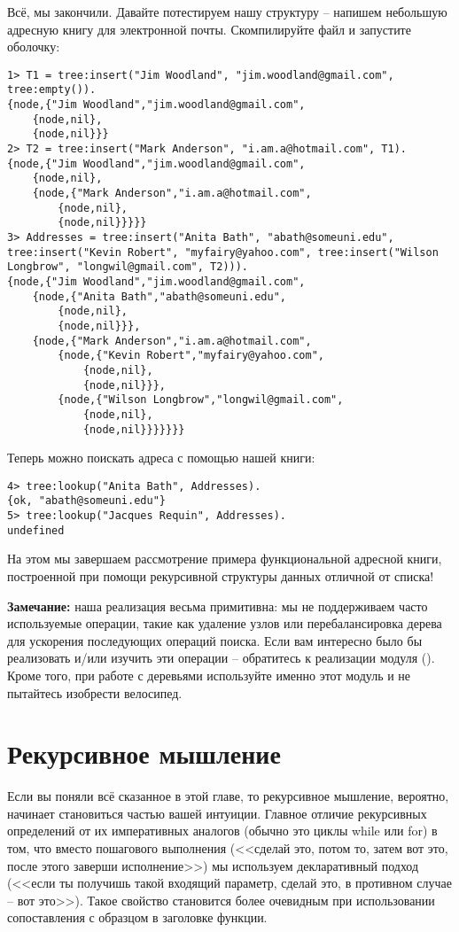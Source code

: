Всё, мы закончили.
Давайте потестируем нашу структуру \--- напишем небольшую адресную книгу для электронной почты.
Скомпилируйте файл и запустите оболочку:
\begin{lstlisting}[style=erlang]
1> T1 = tree:insert("Jim Woodland", "jim.woodland@gmail.com", tree:empty()).
{node,{"Jim Woodland","jim.woodland@gmail.com",
    {node,nil},
    {node,nil}}}
2> T2 = tree:insert("Mark Anderson", "i.am.a@hotmail.com", T1).
{node,{"Jim Woodland","jim.woodland@gmail.com",
    {node,nil},
    {node,{"Mark Anderson","i.am.a@hotmail.com",
        {node,nil},
        {node,nil}}}}}
3> Addresses = tree:insert("Anita Bath", "abath@someuni.edu", tree:insert("Kevin Robert", "myfairy@yahoo.com", tree:insert("Wilson Longbrow", "longwil@gmail.com", T2))).
{node,{"Jim Woodland","jim.woodland@gmail.com",
    {node,{"Anita Bath","abath@someuni.edu",
        {node,nil},
        {node,nil}}},
    {node,{"Mark Anderson","i.am.a@hotmail.com",
        {node,{"Kevin Robert","myfairy@yahoo.com",
            {node,nil},
            {node,nil}}},
        {node,{"Wilson Longbrow","longwil@gmail.com",
            {node,nil},
            {node,nil}}}}}}}
\end{lstlisting}

Теперь можно поискать адреса с помощью нашей книги:
\begin{lstlisting}[style=erlang]
4> tree:lookup("Anita Bath", Addresses).
{ok, "abath@someuni.edu"}
5> tree:lookup("Jacques Requin", Addresses).
undefined
\end{lstlisting}

На этом мы завершаем рассмотрение примера функциональной адресной книги, построенной при помощи рекурсивной структуры данных отличной от списка!\\
\colorbox{lgray}
{
    \begin{minipage}{\linewidth}
\textbf{Замечание:} наша реализация весьма примитивна: мы не поддерживаем часто используемые операции, такие как удаление узлов или перебалансировка дерева для ускорения последующих операций поиска.
Если вам интересно было бы реализовать и/или изучить эти операции \--- обратитесь к реализации модуля  ().
Кроме того, при работе с деревьями используйте именно этот модуль и не пытайтесь изобрести велосипед.
    \end{minipage}
}
\section{Рекурсивное мышление}
\label{thinking-recursively}
Если вы поняли всё сказанное в этой главе, то рекурсивное мышление, вероятно, начинает становиться частью вашей интуиции.
Главное отличие рекурсивных определений от их императивных аналогов (обычно это циклы while или for) в том, что вместо пошагового выполнения (<<сделай это, потом то, затем вот это, после этого заверши исполнение>>) мы используем декларативный подход (<<если ты получишь такой входящий параметр, сделай это, в противном случае \--- вот это>>).
Такое свойство становится более очевидным при использовании сопоставления с образцом в заголовке функции.


